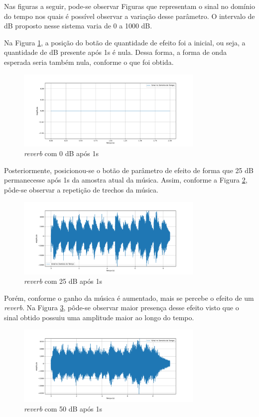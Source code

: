 Nas figuras a seguir, pode-se observar Figuras que representam o sinal no domínio do tempo nos quais é possível observar a variação desse parâmetro. O intervalo de dB proposto nesse sistema varia de 0 a 1000 dB.

Na Figura \ref{fig70}, a posição do botão de quantidade de efeito foi a inicial, ou seja, a quantidade de dB presente após 1s é nula. Dessa forma, a forma de onda esperada seria também nula, conforme o que foi obtida.


\begin{figure}[h]
	\centering
    \includegraphics[width=0.8\textwidth]{figuras/fig70.png}
	\caption{\textit{reverb} com 0 dB após 1s}
	\label{fig70}
\end{figure}

Posteriormente, posicionou-se o botão de parâmetro de efeito de forma que 25 dB permanecesse após 1s da amostra atual da música. Assim, conforme a Figura \ref{fig71}, pôde-se observar a repetição de trechos da música. 

\begin{figure}[h]
	\centering
    \includegraphics[width=0.8\textwidth]{figuras/fig71.png}
	\caption{\textit{reverb} com 25 dB após 1s}
	\label{fig71}
\end{figure}

Porém, conforme o ganho da música é aumentado, mais se percebe o efeito de um \textit{reverb}. Na Figura \ref{fig72}, pôde-se observar maior presença desse efeito visto que o sinal obtido possuiu uma amplitude maior ao longo do tempo.

\begin{figure}[h]
	\centering
    \includegraphics[width=0.8\textwidth]{figuras/fig72.png}
	\caption{\textit{reverb} com 50 dB após 1s}
	\label{fig72}
\end{figure}

